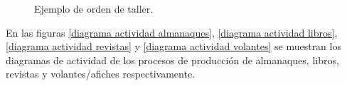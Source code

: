 \documentclass[a4paper, 12pt,twoside]{report}  %
\numberwithin{equation}{subsection} %
\begin{document}
\begin{figure}[h!]
\centering
{%
\setlength{\fboxsep}{0pt}%
\setlength{\fboxrule}{0.5pt}%
%
}%
\caption{Ejemplo de orden de taller.}
\label{orden taller}
\end{figure}

\indent En las figuras \ref{diagrama actividad almanaques}, \ref{diagrama actividad libros}, \ref{diagrama actividad revistas} y \ref{diagrama actividad volantes} se muestran los diagramas de actividad de los procesos de producción de almanaques, libros, revistas y volantes/afiches respectivamente.
\end{document}
